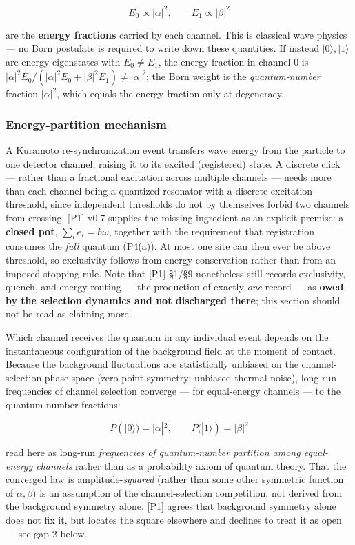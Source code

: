 \documentclass[
]{article}
\newcounter{none} %
\begin{document}
\[E_0 \propto |\alpha|^2, \qquad E_1 \propto |\beta|^2\]

are the \textbf{energy fractions} carried by each channel. This is
classical wave physics --- no Born postulate is required to write down
these quantities. If instead \(|0\rangle, |1\rangle\) are energy
eigenstates with \(E_0 \neq E_1\), the energy fraction in channel 0 is
\(|\alpha|^2 E_0/(|\alpha|^2 E_0 + |\beta|^2 E_1) \neq |\alpha|^2\); the
Born weight is the \emph{quantum-number} fraction \(|\alpha|^2\), which
equals the energy fraction only at degeneracy.

\subsubsection{Energy-partition
mechanism}\label{energy-partition-mechanism}

A Kuramoto re-synchronization event transfers wave energy from the
particle to one detector channel, raising it to its excited (registered)
state. A discrete click --- rather than a fractional excitation across
multiple channels --- needs more than each channel being a quantized
resonator with a discrete excitation threshold, since independent
thresholds do not by themselves forbid two channels from crossing.
{[}P1{]} v0.7 supplies the missing ingredient as an explicit premise: a
\textbf{closed pot}, \(\sum_i e_i = \hbar\omega\), together with the
requirement that registration consumes the \emph{full} quantum (P4(a)).
At most one site can then ever be above threshold, so exclusivity
follows from energy conservation rather than from an imposed stopping
rule. Note that {[}P1{]} §1/§9 nonetheless still records exclusivity,
quench, and energy routing --- the production of exactly \emph{one}
record --- as \textbf{owed by the selection dynamics and not discharged
there}; this section should not be read as claiming more.

Which channel receives the quantum in any individual event depends on
the instantaneous configuration of the background field at the moment of
contact. Because the background fluctuations are statistically unbiased
on the channel-selection phase space (zero-point symmetry; unbiased
thermal noise), long-run frequencies of channel selection converge ---
for equal-energy channels --- to the quantum-number fractions:

\[\boxed{P(|0\rangle) = |\alpha|^2, \qquad P(|1\rangle) = |\beta|^2}\]

read here as long-run \emph{frequencies of quantum-number partition
among equal-energy channels} rather than as a probability axiom of
quantum theory. That the converged law is amplitude-\emph{squared}
(rather than some other symmetric function of \(\alpha, \beta\)) is an
assumption of the channel-selection competition, not derived from the
background symmetry alone. {[}P1{]} agrees that background symmetry
alone does not fix it, but locates the square elsewhere and declines to
treat it as open --- see gap 2 below.
\end{document}
